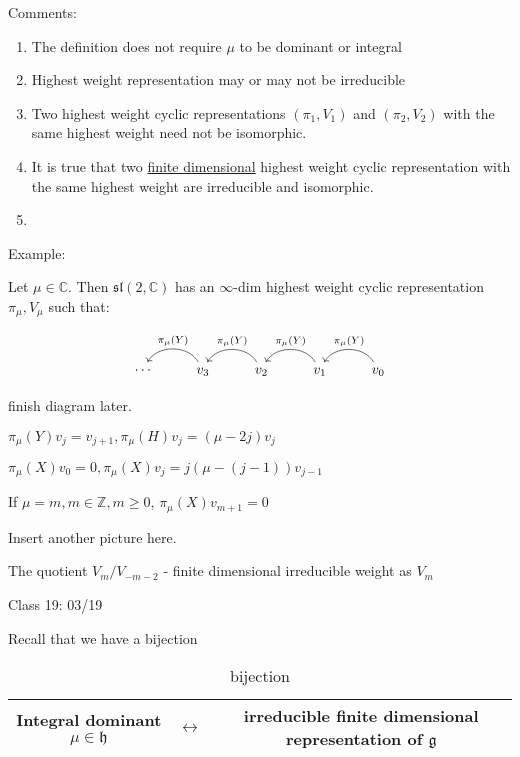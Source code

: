 \documentclass{article}
\theoremstyle{definition}
\begin{document}
Comments:

\begin{enumerate}
    \item The definition does not require \(\mu\) to be dominant or integral
    \item Highest weight representation may or may not be irreducible
    \item Two highest weight cyclic representations \((\pi_1 ,V_1)\) and \((\pi_2, V_2)\) with the same highest weight need not be isomorphic.
    \item It is true that two \underline{finite dimensional} highest weight cyclic representation with the same highest weight are irreducible and isomorphic.
    \item 
\end{enumerate}

Example:

Let \(\mu \in \mathbb{C}\). Then \(\mathfrak{sl} (2,\mathbb{C})\) has an \(\infty\)-dim highest weight cyclic representation \(\pi_\mu , V_\mu\) such that:

\[
    \begin{tikzcd}
        \cdots & v_3 \ar[l,bend right = 60, "\pi_\mu(Y)",swap] & v_2 \ar[l,bend right = 60, "\pi_\mu(Y)",swap] & v_1 \ar[l,bend right = 60, "\pi_\mu(Y)",swap] & v_0 \ar[l,bend right = 60, "\pi_\mu(Y)",swap]
    \end{tikzcd}
\]

finish diagram later.

\(\pi_\mu(Y)v_j = v_{j+1}, \pi_\mu(H)v_j = (\mu-2j)v_j\)

\(\pi_\mu(X)v_0 = 0, \pi_\mu(X)v_j = j (\mu - (j-1))v_{j-1}\) 

If \(\mu = m, m\in \mathbb{Z} , m \geq 0\), \(\pi_\mu(X)v_{m+1} = 0\) 

Insert another picture here.

The quotient \(V_m / V_{-m-2} \) - finite dimensional irreducible weight as \(V_m\)  

\hrulefill

Class 19: 03/19

Recall that we have a bijection

\begin{table}[H]
    \centering
    \begin{tabular}{c|c|c}
        \toprule
           Integral dominant \(\mu \in \mathfrak{h} \)   & \(\leftrightarrow\) & irreducible finite dimensional representation of \(\mathfrak{g}\)   \\
        \bottomrule
    \end{tabular}
    \caption{bijection}
    \label{tab:label}
\end{table} 
\end{document}
